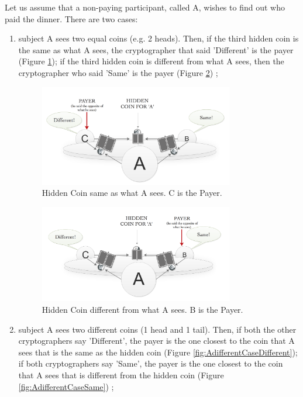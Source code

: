 \begin{enumerate}
    Let us assume that a non-paying participant, called A, wishes to find out who paid the dinner. There are two cases: \begin{enumerate}
        \item subject A sees two equal coins (e.g. 2 heads). Then, if the third hidden coin is the same as what A sees, the cryptographer that said 'Different' is the payer (Figure \ref{fig:AsameCaseSame}); if the third hidden coin is different from what A sees, then the cryptographer who said 'Same' is the payer (Figure \ref{fig:AsameCaseDifferent}) \cite{Chaum};
        \begin{figure}[h!]
            \centering
            \includegraphics[width=0.80\textwidth]{Images/AsameCase1.png}
            \caption{Hidden Coin same as what A sees. C is the Payer.}
            \label{fig:AsameCaseSame}
        \end{figure}
        \begin{figure}[h!]
            \centering
            \includegraphics[width=0.80\textwidth]{Images/AsameCase2.png}
            \caption{Hidden Coin different from what A sees. B is the Payer.}
            \label{fig:AsameCaseDifferent}
        \end{figure}
        \item subject A sees two different coins (1 head and 1 tail). Then, if both the other cryptographers say 'Different', the payer is the one closest to the coin that A sees that is the same as the hidden coin (Figure \ref{fig:AdifferentCaseDifferent}); if both cryptographers say 'Same', the payer is the one closest to the coin that A sees that is different from the hidden coin (Figure \ref{fig:AdifferentCaseSame}) \cite{Chaum};

\end{enumerate}
\end{enumerate}

